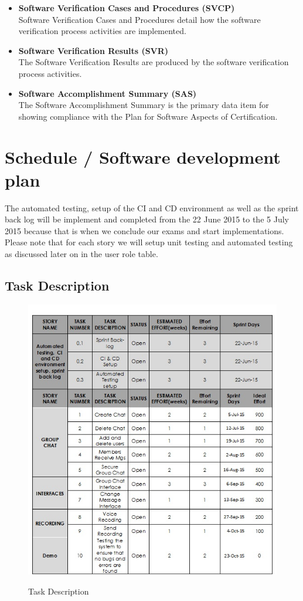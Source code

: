 \documentclass[a4paper]{article}
\begin{document}
\begin{itemize}
	\item \textbf{Software Verification Cases and Procedures (SVCP)}\\
		Software Verification Cases and Procedures detail how the software verification process activities are implemented.
	\item \textbf{Software Verification Results (SVR)}\\
		The Software Verification Results are produced by the software verification process activities.
	\item \textbf{Software Accomplishment Summary (SAS)}\\
		The Software Accomplishment Summary is the primary data item for showing compliance with the Plan for Software Aspects of Certification.
\end{itemize}
\newpage

\section{Schedule / Software development plan}
The automated testing, setup of the CI and CD environment as well as the sprint back log will be implement and completed from the 22 June 2015 to the 5 July 2015 because that is when we conclude our exams and start implementations.
Please note that for each story we will setup unit testing and automated testing as discussed later on in the user role table.

\subsection{Task Description}
\begin{figure}[H]
\includegraphics[width=1\linewidth]{./pictures/task.jpg}\\
\caption{\label{fig:Task Discription}Task Description}
\end{figure}
\end{document}
